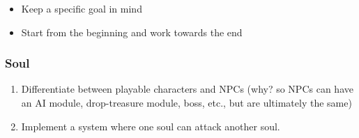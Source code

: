 \documentclass{article}
\begin{document}
\begin{itemize}
    \item Keep a specific goal in mind 
    \item Start from the beginning and work towards the end
\end{itemize}

\subsubsection*{Soul}

\begin{enumerate}
    \item Differentiate between playable characters and NPCs (why?
        so NPCs can have an AI module, drop-treasure module, boss,
        etc., but are ultimately the same)
    \item Implement a system where one soul can attack another soul.
\end{enumerate}
\end{document}
